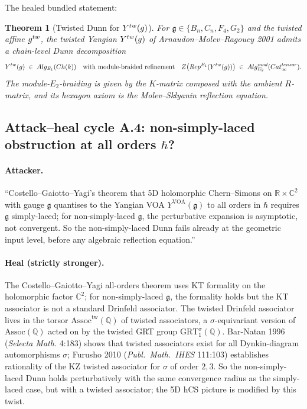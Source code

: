 \documentclass[11pt]{article}
\newtheorem{theorem}{Theorem}[section]
\newcommand{\Eone}{E_{1}}
\newcommand{\Etwo}{E_{2}}
\newcommand{\Alg}{\mathrm{Alg}}
\newcommand{\Cat}{\mathrm{Cat}}
\newcommand{\R}{\mathbb{R}}
\newcommand{\C}{\mathbb{C}}
\newcommand{\Q}{\mathbb{Q}}
\newcommand{\cZ}{\mathcal{Z}}
\newcommand{\Rep}{\mathrm{Rep}}
\newcommand{\frakg}{\mathfrak{g}}
\begin{document}
The healed bundled statement:
\begin{theorem}[Twisted Dunn for $Y^{\mathrm{tw}}(\widehat\frakg)$]
  \label{thm:twisted-dunn-yangian}
  For $\frakg \in \{B_n, C_n, F_4, G_2\}$ and the twisted affine
  $\widehat\frakg^{\mathrm{tw}}$, the twisted Yangian
  $Y^{\mathrm{tw}}(\widehat\frakg)$ of Arnaudon--Molev--Ragoucy 2001
  admits a chain-level Dunn decomposition
  \[
    Y^{\mathrm{tw}}(\widehat\frakg) \;\in\; \Alg_{\Eone}(\mathrm{Ch}(k))
    \quad\text{with module-braided refinement}\quad
    \cZ\bigl(\Rep^{\Eone}(Y^{\mathrm{tw}}(\widehat\frakg))\bigr)
    \;\in\; \Alg^{\mathrm{mod}}_{\Etwo}(\Cat_\infty^{\otimes}).
  \]
  The module-$\Etwo$-braiding is given by the $K$-matrix composed
  with the ambient $R$-matrix, and its hexagon axiom is the
  Molev--Sklyanin reflection equation.
\end{theorem}

\subsection{Attack--heal cycle A.4: non-simply-laced obstruction at all
  orders $\hbar$?}

\paragraph{Attacker.}
``Costello--Gaiotto--Yagi's theorem that 5D holomorphic Chern--Simons
on $\R \times \C^2$ with gauge $\frakg$ quantises to the Yangian VOA
$Y^{\mathrm{VOA}}(\frakg)$ to all orders in $\hbar$ requires $\frakg$
simply-laced; for non-simply-laced $\frakg$, the perturbative expansion
is asymptotic, not convergent. So the non-simply-laced Dunn fails
already at the geometric input level, before any algebraic reflection
equation.''

\paragraph{Heal (strictly stronger).}
The Costello--Gaiotto--Yagi all-orders theorem uses KT formality on
the holomorphic factor $\C^2$; for non-simply-laced $\frakg$, the
formality holds but the KT associator is not a standard Drinfeld
associator. The twisted Drinfeld associator lives in the torsor
$\mathrm{Assoc}^{\mathrm{tw}}(\Q)$ of twisted associators, a
$\sigma$-equivariant version of $\mathrm{Assoc}(\Q)$ acted on by the
twisted GRT group $\mathrm{GRT}_1^{\sigma}(\Q)$. Bar-Natan 1996
(\emph{Selecta Math.} 4:183) shows that twisted associators exist for
all Dynkin-diagram automorphisms $\sigma$; Furusho 2010
(\emph{Publ.~Math.~IHES} 111:103) establishes rationality of the KZ
twisted associator for $\sigma$ of order $2, 3$. So the non-simply-laced
Dunn holds perturbatively with the same convergence radius as the
simply-laced case, but with a twisted associator; the 5D hCS picture
is modified by this twist.
\end{document}
